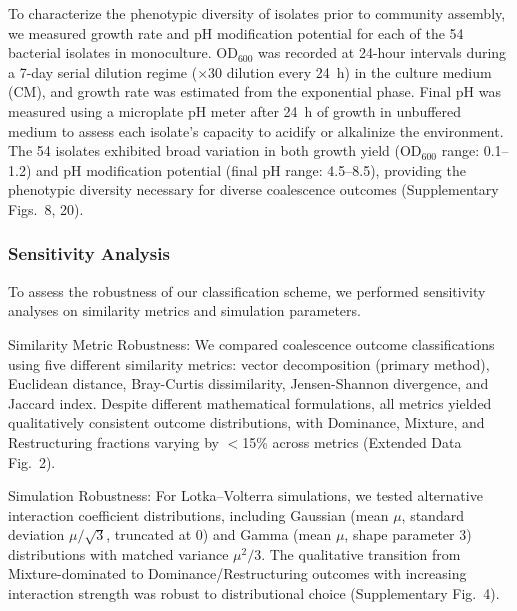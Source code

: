 To characterize the phenotypic diversity of isolates prior to community assembly, we measured growth rate and pH modification potential for each of the 54 bacterial isolates in monoculture. OD$_{600}$ was recorded at 24-hour intervals during a 7-day serial dilution regime ($\times$30 dilution every 24~h) in the culture medium (CM), and growth rate was estimated from the exponential phase. Final pH was measured using a microplate pH meter after 24~h of growth in unbuffered medium to assess each isolate's capacity to acidify or alkalinize the environment. The 54 isolates exhibited broad variation in both growth yield (OD$_{600}$ range: 0.1--1.2) and pH modification potential (final pH range: 4.5--8.5), providing the phenotypic diversity necessary for diverse coalescence outcomes (Supplementary Figs.~8, 20).


\subsubsection*{Sensitivity Analysis}
\label{sec:suppl:sensitivity}

To assess the robustness of our classification scheme, we performed sensitivity analyses on similarity metrics and simulation parameters.

Similarity Metric Robustness: We compared coalescence outcome classifications using five different similarity metrics: vector decomposition (primary method), Euclidean distance, Bray-Curtis dissimilarity, Jensen-Shannon divergence, and Jaccard index. Despite different mathematical formulations, all metrics yielded qualitatively consistent outcome distributions, with Dominance, Mixture, and Restructuring fractions varying by $<$15\% across metrics (Extended Data Fig.~2).

Simulation Robustness: For Lotka--Volterra simulations, we tested alternative interaction coefficient distributions, including Gaussian (mean $\mu$, standard deviation $\mu/\sqrt{3}$, truncated at 0) and Gamma (mean $\mu$, shape parameter 3) distributions with matched variance $\mu^2/3$. The qualitative transition from Mixture-dominated to Dominance/Restructuring outcomes with increasing interaction strength was robust to distributional choice (Supplementary Fig.~4).

